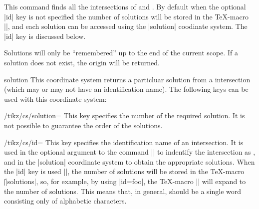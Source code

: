 \begin{command}{\tikzintersectnamedpaths\opt{|[id=|\meta{name}|]|}}
  
  This command finds all the intersections of  and 
  . By default when the optional |id| key is not 
  specified the number of solutions will be stored in the 
  \TeX-macro |\solutions|, and each solution can be accessed 
  using the |solution| coodinate system. The |id| key is
  discussed below.
  
  Solutions will only be ``remembered'' up to the end of the current
  scope. If a solution does not exist, the origin will be
  returned. 
  
\begin{coordinatesystem}{solution}
  This coordinate system returns a particluar solution from 
  a intersection (which may or may not have an identification 
  name). The following keys can be used with this coordinate
  system:

\begin{key}{/tikz/cs/solution=}
  This key specifies the number of the required solution. It is not
  possible to guarantee the order of the solutions.

\begin{codeexample}[]
\end{codeexample}
\end{key}

\begin{key}{/tikz/cs/id=}
  This key specifies the identification name of an intersection.
  It is used in the optional argument to the command 
  |\tikzintersectnamedpaths| to indentify the intersection as 
  , and in the |solution| coordinate system to obtain 
  the appropriate solutions.
  When the |id| key is used |\tikzintersectnamedpaths|, the number 
  of solutions will be stored in the \TeX-macro 
  |\||solutions|, so, for example, by 
  using |id=foo|, the \TeX-macro |\foosolutions|  will expand to the 
  number of solutions. This means that, in general,  
  should be a single word consisting only of alphabetic characters.
\end{key}


\end{coordinatesystem}
\end{command}
